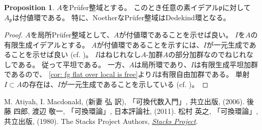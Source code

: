 \documentclass[uplatex]{jsarticle}
\theoremstyle{definition}
\newtheorem{prop}[prop]{Proposition}
\theoremstyle{plain}
\begin{document}
\begin{prop}
  \(A\)をPr\"{u}fer整域とする。
  このとき任意の素イデアル\(\mathfrak{p}\)に対して
  \(A_{\mathfrak{p}}\)は付値環である。
  特に、NoetherなPr\"{u}fer整域はDedekind環となる。
\end{prop}

\begin{proof}
  \(A\)を局所Pr\"{u}fer整域として、\(A\)が付値環であることを示せば良い。
  \(I\)を\(A\)の有限生成イデアルとする。
  \(A\)が付値環であることを示すには、\(I\)が一元生成であることを示せば良い
  (cf. \cite[\href{https://stacks.math.columbia.edu/tag/090Q}{Tag 090Q}]{stacks-project})。
  \(I\)はねじれなし\(A\)-加群\(A\)の部分加群なのでねじれなしである。
  従って平坦である。
  一方、\(A\)は局所環であり、\(I\)は有限生成平坦加群であるので、
  \autoref{cor: fg flat over local is free}より\(I\)は有限自由加群である。
  単射\(I\subset A\)の存在は、\(I\)が一元生成であることを示している
  (cf. \cite[演習2.11]{AM})。
\end{proof}




\begin{thebibliography}{9}
  M. Atiyah, I. Macdonald, (新妻 弘 訳),
  「可換代数入門」, 共立出版, (2006).
  後藤 四郎, 渡辺 敬一,
  「可換環論」, 日本評論社, (2011).
  松村 英之,
  「可換環論」, 共立出版, (1980).
  The Stacks Project Authors,
  \href{https://stacks.math.columbia.edu/}{\textit{Stacks Project}}.
\end{thebibliography}
\end{document}
